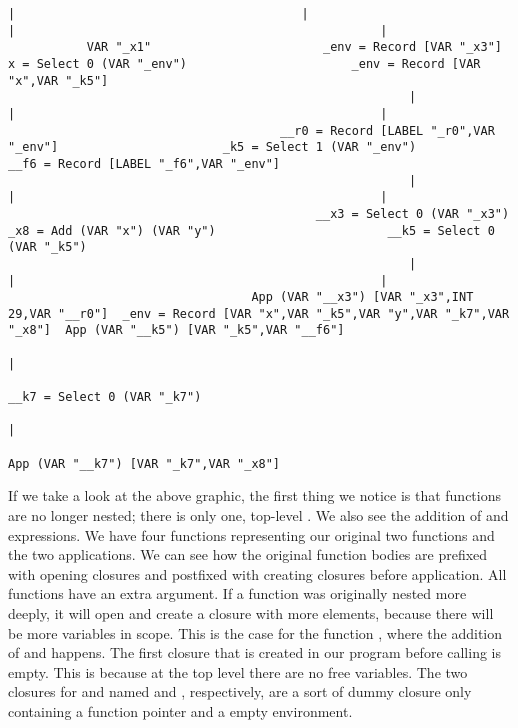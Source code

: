 \begin{landscape}
\begin{lstlisting}[basicstyle=\fontsize{6.25}{7.25}\selectfont\ttfamily]
               |                                        |                                                       |                                                   |
           VAR "_x1"                        _env = Record [VAR "_x3"]                               x = Select 0 (VAR "_env")                       _env = Record [VAR "x",VAR "_k5"]
                                                        |                                                       |                                                   |
                                      __r0 = Record [LABEL "_r0",VAR "_env"]                       _k5 = Select 1 (VAR "_env")                    __f6 = Record [LABEL "_f6",VAR "_env"]
                                                        |                                                       |                                                   |
                                           __x3 = Select 0 (VAR "_x3")                            _x8 = Add (VAR "x") (VAR "y")                        __k5 = Select 0 (VAR "_k5")
                                                        |                                                       |                                                   |
                                  App (VAR "__x3") [VAR "_x3",INT 29,VAR "__r0"]  _env = Record [VAR "x",VAR "_k5",VAR "y",VAR "_k7",VAR "_x8"]  App (VAR "__k5") [VAR "_k5",VAR "__f6"]
                                                                                                                |
                                                                                                   __k7 = Select 0 (VAR "_k7")
                                                                                                                |
                                                                                              App (VAR "__k7") [VAR "_k7",VAR "_x8"]

\end{lstlisting}
If we take a look at the above graphic, the first thing we notice is that functions are no longer nested; there is only one, top-level . We also see the addition of  and  expressions. We have four functions representing our original two functions and the two applications. We can see how the original function bodies are prefixed with opening closures and postfixed with creating closures before application. All functions have an extra  argument. If a function was originally nested more deeply, it will open and create a closure with more elements, because there will be more variables in scope. This is the case for the function , where the addition of  and  happens. The first closure that is created in our program before calling  is empty. This is because at the top level there are no free variables. The two closures for  and  named  and , respectively, are a sort of dummy closure only containing a function pointer and a empty environment.
\end{landscape}
\clearpage

